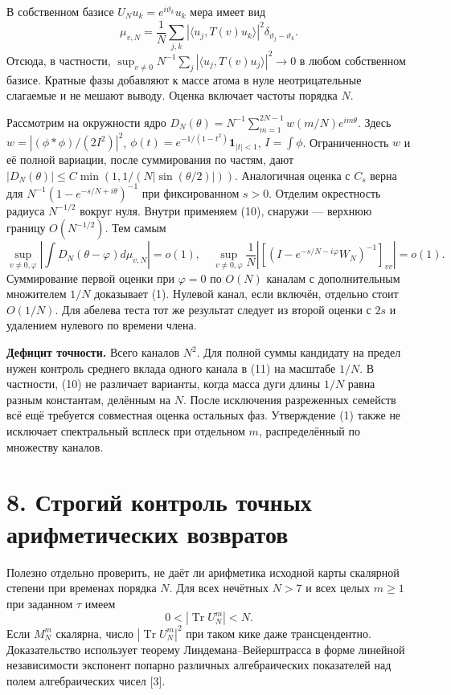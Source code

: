 \documentclass[11pt,a4paper]{article}
\newcommand{\Tr}{\operatorname{Tr}}
\newcommand{\sect}[1]{\section*{\sffamily\color{ink}#1}}
\newcommand{\subt}[1]{\par\medskip\noindent\textbf{#1.}\quad}
\begin{document}
В собственном базисе $U_N u_k=e^{i\vartheta_k}u_k$ мера имеет вид
\[
 \mu_{v,N}=\frac1N\sum_{j,k}|\langle u_j,T(v)u_k\rangle|^2
              \delta_{\vartheta_j-\vartheta_k}.
\]
Отсюда, в частности, $\sup_{v\ne0}N^{-1}\sum_j |\langle u_j,T(v)u_j\rangle|^2\to0$ в любом собственном базисе. Кратные фазы добавляют к массе атома в нуле неотрицательные слагаемые и не мешают выводу. Оценка включает частоты порядка $N$.

Рассмотрим на окружности ядро $D_N(\theta)=N^{-1}\sum_{m=1}^{2N-1}w(m/N)e^{im\theta}$. Здесь $w=|(\phi*\phi)/(2I^2)|^2$, $\phi(t)=e^{-1/(1-t^2)}\mathbf1_{|t|<1}$, $I=\int\phi$. Ограниченность $w$ и её полной вариации, после суммирования по частям, дают $|D_N(\theta)|\le C\min(1,1/(N|\sin(\theta/2)|))$. Аналогичная оценка с $C_s$ верна для $N^{-1}(1-e^{-s/N+i\theta})^{-1}$ при фиксированном $s>0$. Отделим окрестность радиуса $N^{-1/2}$ вокруг нуля. Внутри применяем (10), снаружи --- верхнюю границу $O(N^{-1/2})$. Тем самым
\[
 \sup_{v\ne0,\varphi}\left|\int D_N(\theta-\varphi)d\mu_{v,N}\right|=o(1),
 \quad
 \sup_{v\ne0,\varphi}\frac1N\left|[(I-e^{-s/N-i\varphi} W_N)^{-1}]_{vv}\right|
 =o(1).                                                                    \tag{11}
\]
Суммирование первой оценки при $\varphi=0$ по $O(N)$ каналам с дополнительным множителем $1/N$ доказывает (1). Нулевой канал, если включён, отдельно стоит $O(1/N)$. Для абелева теста тот же результат следует из второй оценки с $2s$ и удалением нулевого по времени члена.

\subt{Дефицит точности} Всего каналов $N^2$. Для полной суммы кандидату на предел нужен контроль среднего вклада одного канала в (11) на масштабе $1/N$. В частности, (10) не различает варианты, когда масса дуги длины $1/N$ равна разным константам, делённым на $N$. После исключения разреженных семейств всё ещё требуется совместная оценка остальных фаз. Утверждение (1) также не исключает спектральный всплеск при отдельном $m$, распределённый по множеству каналов.
\newpage
\sect{8. Строгий контроль точных арифметических возвратов}
Полезно отдельно проверить, не даёт ли арифметика исходной карты скалярной степени при временах порядка $N$. Для всех нечётных $N>7$ и всех целых $m\ge1$ при заданном $\tau$ имеем
\[
 0<|\Tr U_N^m|<N .                                                         \tag{12}
\]
Если $M_N^m$ скалярна, число $|\Tr U_N^m|^2$ при таком кике даже трансцендентно. Доказательство использует теорему Линдемана--Вейерштрасса в форме линейной независимости экспонент попарно различных алгебраических показателей над полем алгебраических чисел [3].
\end{document}
